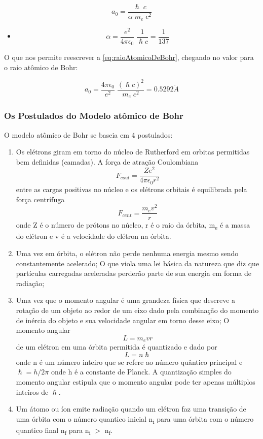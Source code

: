 \documentclass[11pt,a4paper]{article}
\newcounter{exemplo}
\begin{document}
		\begin{equation}
			a_0 = \frac{\hslash \; c}{\alpha \; m_e \; c^2}
			\label{eq:raioAtomicoDeBohr}
		\end{equation}

		\begin{exemplo}[onde:]
			\begin{itemize}
				\item $$\alpha = \frac{e^2}{4 \pi \epsilon_0} \; \frac{1}{\hslash c} = \frac{1}{137}$$
			\end{itemize}
		\end{exemplo}

    O que nos permite reescrever a  \ref{eq:raioAtomicoDeBohr}, chegando no valor para o raio atômico de Bohr:

        $$a_0 = \frac{4 \pi \epsilon_0}{e^2} \; \frac{(\hslash c)^2}{m_e \; c^2} = 0.5292 \mathring{A} $$

\subsubsection*{Os Postulados do Modelo atômico de Bohr}

     O modelo atômico de Bohr se baseia em 4 postulados:

	 \begin{enumerate}[label=\textcolor{CarnationPink}{\arabic*${}^\circ$}]
		\item Os elétrons giram em torno do núcleo de Rutherford em orbitas permitidas bem definidas (camadas). A força de atração Coulombiana $$F_{coul} = \frac{Ze^2 }{4 \pi \epsilon_0 r^2}$$ entre as cargas positivas no núcleo e os elétrons orbitais é equilibrada pela força centrífuga $$F_{cent} = \frac{m_e v^2}{r}$$ onde Z é o número de prótons no núcleo, r é o raio da órbita, m\textsubscript{e} é a massa do elétron e  v é a velocidade do elétron na órbita.		
		\item Uma vez em órbita, o elétron não perde nenhuma energia mesmo sendo constantemente acelerado; O que viola uma lei básica da natureza que diz que partículas carregadas aceleradas perderão parte de sua energia em forma de radiação;		
		\item Uma vez que o momento angular é uma grandeza física que descreve a rotação de um objeto ao redor de um eixo dado pela combinação do momento de inércia do objeto e sua velocidade angular em torno desse eixo; O momento angular $$L = m_e v r$$ de um elétron em uma órbita permitida é quantizado e dado por $$L = n \hslash$$ onde n é um número inteiro que se refere ao número quântico principal e $\hslash = h / 2 \pi$ onde h é a constante de Planck. A quantização simples do momento angular estipula que o momento angular pode ter apenas múltiplos inteiros de $\hslash$.		
		\item Um átomo ou íon emite radiação quando um elétron faz uma transição de uma órbita com o número quantico inicial n\textsubscript{i} para uma órbita com o número quantico final n\textsubscript{f} para n\textsubscript{i} $>$ n\textsubscript{f}.
	\end{enumerate}            
\end{document}
